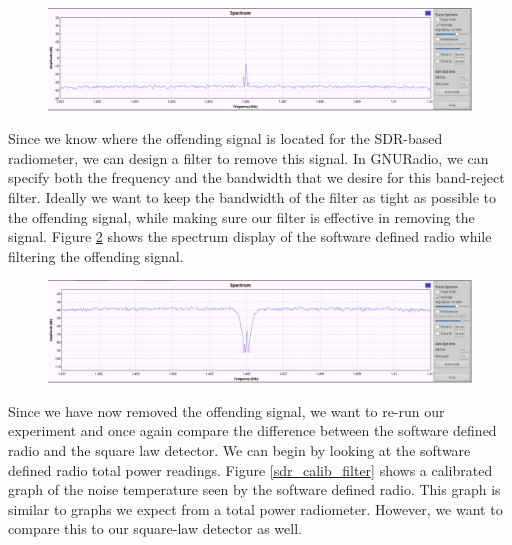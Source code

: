 \begin{figure}[h!tb] \centering
\includegraphics[width=\textwidth]{Images/interfering_signal_filter.png}
\label{spectrum_interfering}
\end{figure}

Since we know where the offending signal is located for the SDR-based radiometer, we can design a filter to remove this signal.  In GNURadio, we can specify both the frequency and the bandwidth that we desire for this band-reject filter.  Ideally we want to keep the bandwidth of the filter as tight as possible to the offending signal, while making sure our filter is effective in removing the signal.  Figure \ref{spectrum_filter} shows the spectrum display of the software defined radio while filtering the offending signal.

\begin{figure}[h!tb] \centering
\includegraphics[width=\textwidth]{Images/interfering_signal.png}
\label{spectrum_filter}
\end{figure}

Since we have now removed the offending signal, we want to re-run our experiment and once again compare the difference between the software defined radio and the square law detector. We can begin by looking at the software defined radio total power readings.  Figure \ref{sdr_calib_filter} shows a calibrated graph of the noise temperature seen by the software defined radio.  This graph is similar to graphs we expect from a total power radiometer.  However, we want to compare this to our square-law detector as well.  

